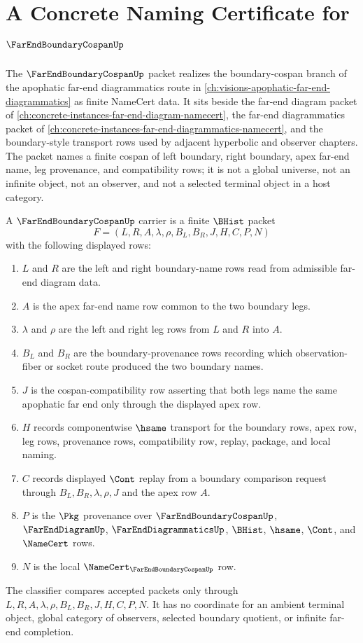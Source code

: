 \chapter{A Concrete Naming Certificate for $\FarEndBoundaryCospanUp$}
\label{ch:concrete-instances-far-end-boundary-cospan-namecert}

The $\FarEndBoundaryCospanUp$ packet realizes the boundary-cospan branch of the apophatic far-end diagrammatics route in \autoref{ch:visions-apophatic-far-end-diagrammatics} as finite NameCert data. It sits beside the far-end diagram packet of \autoref{ch:concrete-instances-far-end-diagram-namecert}, the far-end diagrammatics packet of \autoref{ch:concrete-instances-far-end-diagrammatics-namecert}, and the boundary-style transport rows used by adjacent hyperbolic and observer chapters. The packet names a finite cospan of left boundary, right boundary, apex far-end name, leg provenance, and compatibility rows; it is not a global universe, not an infinite object, not an observer, and not a selected terminal object in a host category.

\begin{definition}
\label{def:far-end-boundary-cospan-carrier}
A $\FarEndBoundaryCospanUp$ carrier is a finite $\BHist$ packet
$$
F=(L,R,A,\lambda,\rho,B_L,B_R,J,H,C,P,N)
$$
with the following displayed rows:
\begin{enumerate}
\item $L$ and $R$ are the left and right boundary-name rows read from admissible far-end diagram data.
\item $A$ is the apex far-end name row common to the two boundary legs.
\item $\lambda$ and $\rho$ are the left and right leg rows from $L$ and $R$ into $A$.
\item $B_L$ and $B_R$ are the boundary-provenance rows recording which observation-fiber or socket route produced the two boundary names.
\item $J$ is the cospan-compatibility row asserting that both legs name the same apophatic far end only through the displayed apex row.
\item $H$ records componentwise $\hsame$ transport for the boundary rows, apex row, leg rows, provenance rows, compatibility row, replay, package, and local naming.
\item $C$ records displayed $\Cont$ replay from a boundary comparison request through $B_L,B_R,\lambda,\rho,J$ and the apex row $A$.
\item $P$ is the $\Pkg$ provenance over $\FarEndBoundaryCospanUp$, $\FarEndDiagramUp$, $\FarEndDiagrammaticsUp$, $\BHist$, $\hsame$, $\Cont$, and $\NameCert$ rows.
\item $N$ is the local $\NameCert_{\FarEndBoundaryCospanUp}$ row.
\end{enumerate}
The classifier compares accepted packets only through $L,R,A,\lambda,\rho,B_L,B_R,J,H,C,P,N$. It has no coordinate for an ambient terminal object, global category of observers, selected boundary quotient, or infinite far-end completion.
\end{definition}

